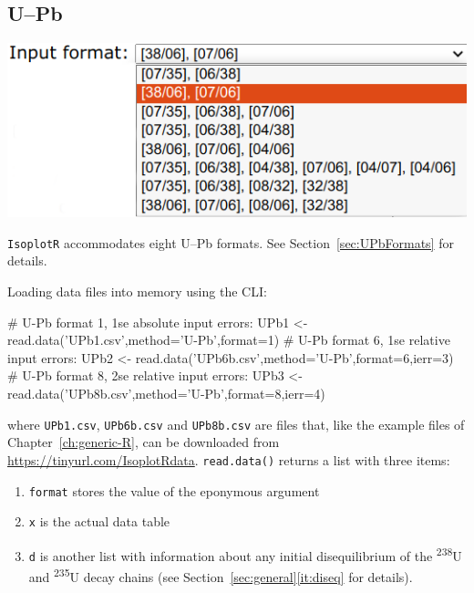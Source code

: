 \begin{refsection}

\chapter{U--Pb}
\label{ch:UPb-R}

\noindent\begin{minipage}[t]{.5\linewidth}
\strut\vspace*{-\baselineskip}\newline
\includegraphics[width=\linewidth]{../figures/UPbFormats.png}\\
\end{minipage}
\begin{minipage}[t]{.5\textwidth}
  \texttt{IsoplotR} accommodates eight U--Pb formats. See
  Section~\ref{sec:UPbFormats} for details.
\end{minipage}

\noindent Loading data files into memory using the CLI:

\begin{script}
# U-Pb format 1, 1se absolute input errors:
UPb1 <- read.data('UPb1.csv',method='U-Pb',format=1)
# U-Pb format 6, 1se relative input errors:
UPb2 <- read.data('UPb6b.csv',method='U-Pb',format=6,ierr=3)
# U-Pb format 8, 2se relative input errors:
UPb3 <- read.data('UPb8b.csv',method='U-Pb',format=8,ierr=4)
\end{script}

\noindent where \texttt{UPb1.csv}, \texttt{UPb6b.csv} and
\texttt{UPb8b.csv} are files that, like the example files of
Chapter~\ref{ch:generic-R}, can be downloaded from
\url{https://tinyurl.com/IsoplotRdata}. \texttt{read.data()} returns a
list with three items:

\begin{enumerate}
\item\texttt{format} stores the value of the eponymous argument
\item\texttt{x} is the actual data table
\item\texttt{d} is another list with information about any initial
  disequilibrium of the \textsuperscript{238}U and
  \textsuperscript{235}U decay chains (see
  Section~\ref{sec:general}\ref{it:diseq} for details).
\end{enumerate}


\end{refsection}
